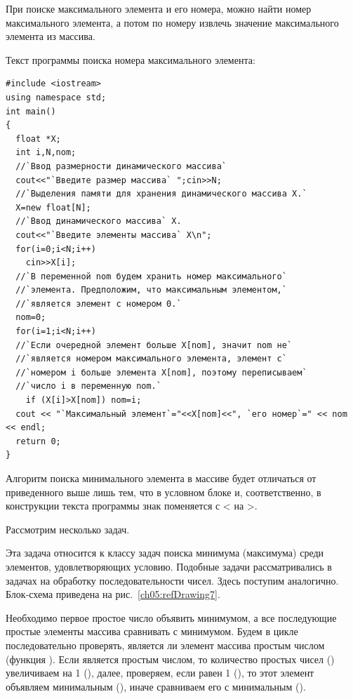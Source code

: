 При поиске максимального элемента и его номера, можно найти номер максимального элемента, а потом по номеру извлечь
значение максимального элемента из массива.

Текст программы поиска номера максимального элемента:
\begin{lstlisting}
#include <iostream>
using namespace std;
int main()
{
  float *X;
  int i,N,nom;
  //`Ввод размерности динамического массива`
  cout<<"`Введите размер массива` ";cin>>N;
  //`Выделения памяти для хранения динамического массива X.`
  X=new float[N];
  //`Ввод динамического массива` X.
  cout<<"`Введите элементы массива` X\n";
  for(i=0;i<N;i++)
    cin>>X[i];
  //`В переменной nom будем хранить номер максимального`
  //`элемента. Предположим, что максимальным элементом,` 
  //`является элемент с номером 0.`
  nom=0;
  for(i=1;i<N;i++)
  //`Если очередной элемент больше X[nom], значит nom не`
  //`является номером максимального элемента, элемент с`
  //`номером i больше элемента X[nom], поэтому переписываем`
  //`число i в переменную nom.`
    if (X[i]>X[nom]) nom=i;
  cout << "`Максимальный элемент`="<<X[nom]<<", `его номер`=" << nom << endl;
  return 0;
}
\end{lstlisting}

 Алгоритм поиска минимального элемента в массиве будет отличаться от приведенного выше лишь тем, что в
условном блоке и, соответственно, в конструкции  текста программы знак поменяется с < на >.

Рассмотрим несколько задач.


Эта задача относится к классу задач поиска минимума (максимума) среди элементов, удовлетворяющих условию. Подобные
задачи рассматривались в задачах на обработку последовательности чисел. Здесь поступим аналогично. Блок-схема приведена
на рис.~\ref{ch05:refDrawing7}.

Необходимо первое простое число объявить минимумом, а все последующие простые элементы массива сравнивать с минимумом.
Будем в цикле последовательно проверять, является ли элемент массива простым числом (функция
). Если  является простым числом, то количество простых чисел
() увеличиваем на 1 (), далее, проверяем, если равен 1
(), то этот элемент объявляем минимальным (), иначе
сравниваем его с минимальным ().


